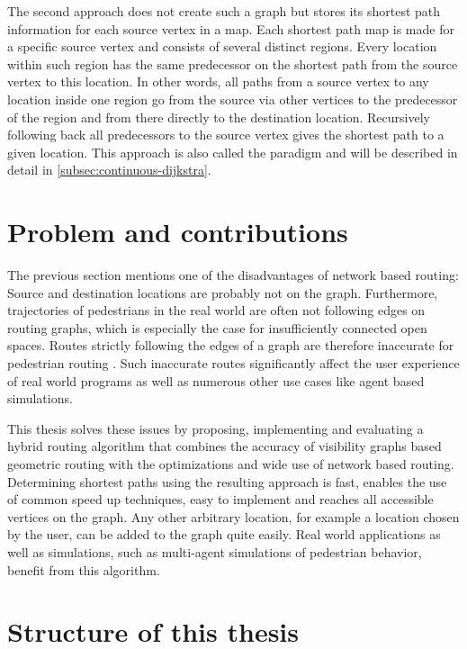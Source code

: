 	The second approach does not create such a graph but stores its shortest path information for each source vertex in a map.
	Each shortest path map is made for a specific source vertex and consists of several distinct regions.
	Every location within such region has the same predecessor on the shortest path from the source vertex to this location.
	In other words, all paths from a source vertex to any location inside one region go from the source via other vertices to the predecessor of the region and from there directly to the destination location.
	Recursively following back all predecessors to the source vertex gives the shortest path to a given location.
	This approach is also called the  paradigm and will be described in detail in \cref{subsec:continuous-dijkstra}.
	
\section{Problem and contributions}

	The previous section mentions one of the disadvantages of network based routing:
	Source and destination locations are probably not on the graph.
	Furthermore, trajectories of pedestrians in the real world are often not following edges on routing graphs, which is especially the case for insufficiently connected open spaces.
	Routes strictly following the edges of a graph are therefore inaccurate for pedestrian routing \cite{graser-osm-open-spaces}.
	Such inaccurate routes significantly affect the user experience of real world programs as well as numerous other use cases like agent based simulations.

	This thesis solves these issues by proposing, implementing and evaluating a hybrid routing algorithm that combines the accuracy of visibility graphs based geometric routing with the optimizations and wide use of network based routing.
	Determining shortest paths using the resulting approach is fast, enables the use of common speed up techniques, easy to implement and reaches all accessible vertices on the graph.
	Any other arbitrary location, for example a location chosen by the user, can be added to the graph quite easily.
	Real world applications as well as simulations, such as multi-agent simulations of pedestrian behavior, benefit from this algorithm.
	
\section{Structure of this thesis}

